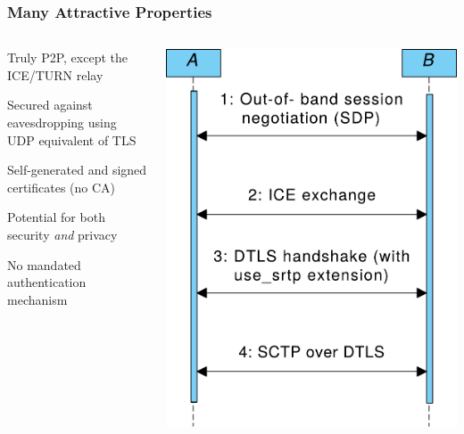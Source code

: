 \documentclass[handout, notes=hide]{beamer}
\begin{document}

\begin{frame}
\frametitle{Many Attractive Properties}

\begin{columns}[T]
\begin{column}[T]{0.6\textwidth}
\setlength{\parskip}{0.5em}

Truly P2P, except the ICE/TURN relay

Secured against eavesdropping using UDP equivalent of TLS

Self-generated and signed certificates (no CA)

Potential for both security {\it and\/} privacy

\quad

No mandated authentication mechanism
\end{column}
\begin{column}[T]{0.4\textwidth}
\vspace{2.5em}
\includegraphics[width=1.0\textwidth]{webrtc-simplified-thinner}
\end{column}
\end{columns}
\end{frame}
\end{document}
